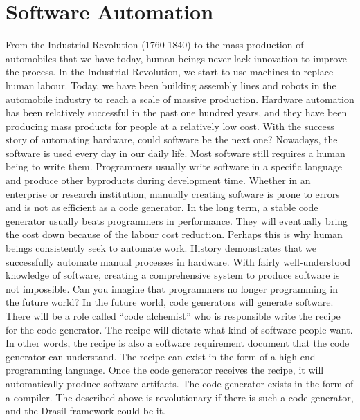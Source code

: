 \chapter{Software Automation}
From the Industrial Revolution (1760-1840) to the mass production of automobiles that we have today, human beings never lack innovation to improve the process. In the Industrial Revolution, we start to use machines to replace human labour. Today, we have been building assembly lines and robots in the automobile industry to reach a scale of massive production. Hardware automation has been relatively successful in the past one hundred years, and they have been producing mass products for people at a relatively low cost. With the success story of automating hardware, could software be the next one? Nowadays, the software is used every day in our daily life. Most software still requires a human being to write them. Programmers usually write software in a specific language and produce other byproducts during development time. Whether in an enterprise or research institution, manually creating software is prone to errors and is not as efficient as a code generator. In the long term, a stable code generator usually beats programmers in performance. They will eventually bring the cost down because of the labour cost reduction. Perhaps this is why human beings consistently seek to automate work. History demonstrates that we successfully automate manual processes in hardware. With fairly well-understood knowledge of software, creating a comprehensive system to produce software is not impossible. Can you imagine that programmers no longer programming in the future world? In the future world, code generators will generate software. There will be a role called ``code alchemist'' who is responsible write the recipe for the code generator. The recipe will dictate what kind of software people want. In other words, the recipe is also a software requirement document that the code generator can understand. The recipe can exist in the form of a high-end programming language. Once the code generator receives the recipe, it will automatically produce software artifacts. The code generator exists in the form of a compiler. The described above is revolutionary if there is such a code generator, and the Drasil framework could be it.
